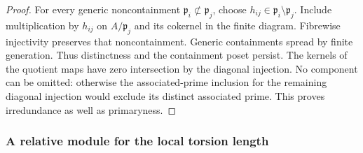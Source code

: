 \begin{proof}
For every generic noncontainment \(\mathfrak p_i\not\subset
\mathfrak p_j\), choose \(h_{ij}\in\mathfrak p_i\setminus\mathfrak p_j\).
Include multiplication by \(h_{ij}\) on \(A/\mathfrak p_j\) and its
cokernel in the finite diagram.  Fibrewise injectivity preserves that
noncontainment.  Generic containments spread by finite generation.
Thus distinctness and the containment poset persist.  The kernels of
the quotient maps have zero intersection by the diagonal injection.
No component can be omitted: otherwise the associated-prime inclusion
for the remaining diagonal injection would exclude its distinct
associated prime.  This proves irredundance as well as primaryness.
\end{proof}

\subsubsection{A relative module for the local torsion length}

